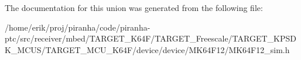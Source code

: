 The documentation for this union was generated from the following file\+:\begin{DoxyCompactItemize}
\item 
/home/erik/proj/piranha/code/piranha-\/ptc/src/receiver/mbed/\+T\+A\+R\+G\+E\+T\+\_\+\+K64\+F/\+T\+A\+R\+G\+E\+T\+\_\+\+Freescale/\+T\+A\+R\+G\+E\+T\+\_\+\+K\+P\+S\+D\+K\+\_\+\+M\+C\+U\+S/\+T\+A\+R\+G\+E\+T\+\_\+\+M\+C\+U\+\_\+\+K64\+F/device/device/\+M\+K64\+F12/M\+K64\+F12\+\_\+sim.\+h\end{DoxyCompactItemize}
